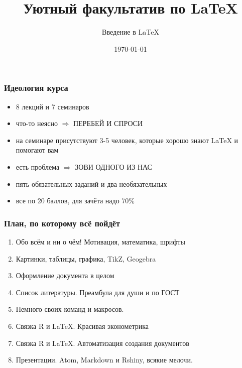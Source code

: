 \documentclass[aspectratio=169,newPxFont]{beamer}
\title{Уютный факультатив по \LaTeX}
\subtitle{Введение в \LaTeX}
\date{\today}
\begin{document}
\begingroup
{}
\begin{frame}[plain]
\begin{center}
\Huge{\color{red}{ВНИМАНИЕ!}}
\end{center}

\begin{center}
\end{center}
\end{frame}
\endgroup

 \maketitle

\begin{frame}
\frametitle{Идеология курса}
\begin{itemize}
\item 8 лекций и 7 семинаров
\item что-то неясно $\Rightarrow$ \alert{ ПЕРЕБЕЙ И СПРОСИ}
\item на семинаре присутствуют 3-5 человек, которые хорошо знают \LaTeX{} и помогают вам
\item есть проблема $\Rightarrow$ \alert{ЗОВИ ОДНОГО ИЗ НАС} 
\item пять обязательных заданий и два необязательных 
\item все по 20 баллов, для зачёта надо 70\% 
\end{itemize}
\end{frame}


\begin{frame}
\frametitle{План, по которому всё пойдёт}
\begin{enumerate}
\item Обо всём и ни о чём! Мотивация, математика, шрифты
\item Картинки, таблицы, графика, TikZ, Geogebra
\item Оформление документа в целом
\item Список литературы.  Преамбула для души и по ГОСТ
\item Немного своих команд и макросов. 
\item Связка R и \LaTeX{}. Красивая эконометрика
\item Связка R и \LaTeX{}. Автоматизация создания документов
\item Презентации. Atom, Markdown и Rshiny,  всякие мелочи.
\end{enumerate}
\end{frame}
\end{document}
